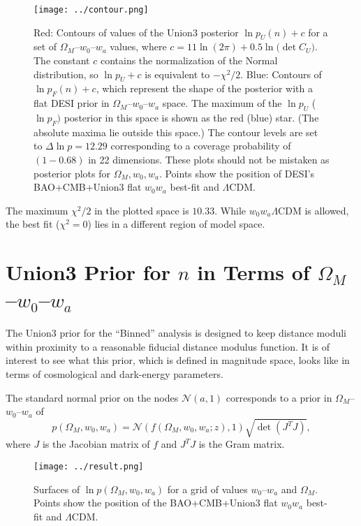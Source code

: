\documentclass[11pt,a4paper]{article}
\begin{document}
\begin{figure}[htbp] %
   \centering
   \texttt{[image: ../contour.png]} 
   \caption{Red: Contours of values of the Union3 posterior $\ln{p_U}(n)+c$ for a
set of $\Omega_M$--$w_0$--$w_a$ values, where $c= 11\ln{(2\pi)} + 0.5\ln({\det{C_U})}$.  The constant $c$ contains the
normalization of the Normal distribution, so $\ln{p_U}+c$  is equivalent to  $-\chi^2/2$.   
   Blue: Contours of  $\ln{p_F}(n)  +c  $, which represent the shape of the posterior with a flat DESI prior in  $\Omega_M$--$w_0$--$w_a$ space.   
   The maximum of the $\ln{p}_U$  ($\ln{p}_F)$ posterior in this space is shown as the red (blue) star.  (The absolute maxima
   lie outside this space.)
   The contour levels are set to $\Delta \ln{p}=12.29$ corresponding to
   a coverage probability of $(1-0.68)$ in 22 dimensions. 
   These plots should not be mistaken as posterior plots for  $\Omega_M, w_0, w_a$. 
   Points show the position of DESI's  BAO+CMB+Union3 flat $w_0w_a$ best-fit 
    and  $\Lambda$CDM.}
   \label{fig:posterior}
\end{figure}

The maximum $\chi^2/2$ in the plotted space is $10.33$.  While $w_0w_a\Lambda$CDM is allowed, the best fit ($\chi^2=0$) lies in a
different region of model space. 

\section{Union3 Prior for $n$ in Terms of $\Omega_M$--$w_0$--$w_a$}
The Union3 prior for the ``Binned'' analysis is designed to keep distance moduli within  proximity to a reasonable
fiducial distance modulus function.  It is of interest to see what this prior, which is defined in magnitude
space, looks like in terms of cosmological and dark-energy parameters.

The standard normal prior on the nodes $\mathcal{N}(a,1)$ corresponds to a prior in  $\Omega_M$--$w_0$--$w_a$ of
\begin{equation}
p(\Omega_M, w_0,w_a) = \mathcal{N}(f(\Omega_M, w_0, w_a; z),1)  \sqrt{\det{\left(J^T J\right)}},
\end{equation}
where $J$ is the Jacobian matrix of $f$ and $J^TJ$ is the Gram matrix.

\begin{figure}[htbp] %
   \centering
   \texttt{[image: ../result.png]} 
   \caption{Surfaces of $\ln{p}(\Omega_M, w_0,w_a)$  for a grid of values
 $w_0$--$w_a$ and $\Omega_M$.   
   Points show the position of the BAO+CMB+Union3 flat $w_0w_a$ best-fit     and  $\Lambda$CDM.}
   \label{fig:priors}
\end{figure}
\end{document}
